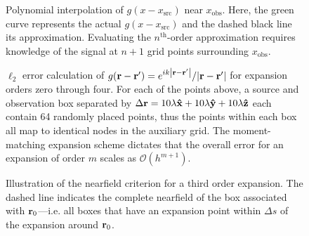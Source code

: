 \begin{figure}
  \centering
  
  \caption{\label{fig:1d moments} Polynomial interpolation of $g(x - x_\text{src})$ near $x_\text{obs}$.
    Here, the green curve represents the actual $g(x - x_\text{src})$ and the dashed black line its approximation.
    Evaluating the $n^\text{th}$-order approximation requires knowledge of the signal at $n + 1$ grid points surrounding $x_\text{obs}$.
  }
\end{figure}

\begin{figure}
  \centering
  
  \caption{\label{fig:grid convergence} $\ell_2$ error calculation of $g(\vb{r} - \vb{r}') = e^{i k \abs{\vb{r} - \vb{r}'}}/{\abs{\vb{r} - \vb{r}'}}$ for expansion orders zero through four.
    For each of the points above, a source and observation box separated by $\Delta \vb{r} = 10\lambda \vu{x} + 10 \lambda \vu{y} + 10 \lambda \vu{z}$ each contain 64 randomly placed points, thus the points within each box all map to identical nodes in the auxiliary grid.
    The moment-matching expansion scheme dictates that the overall error for an expansion of order $m$ scales as $\mathcal{O}(h^{m + 1})$.
  }
\end{figure}

\begin{figure}
  \centering
  
  \caption{\label{fig:nearfield criterion}Illustration of the nearfield criterion for a third order expansion.
    The dashed line indicates the complete nearfield of the box associated with \textcolor{cbblue}{$\vb{r}_0$}---i.e. all boxes that have an expansion point within $\Delta s$ of the expansion around \textcolor{cbblue}{$\vb{r}_0$}.
  }
\end{figure}

